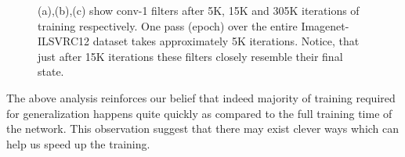 \begin{figure}[t!]
\caption{(a),(b),(c) show conv-1 filters after 5K, 15K and 305K iterations of training respectively. One pass (epoch) over the entire Imagenet-ILSVRC12 dataset takes approximately 5K iterations. Notice, that just after 15K iterations these filters closely resemble their final state.}

\label{fig:conv1}
\end{figure}


\setlength{\tabcolsep}{1pt}
\begin{table}[t!]
\begin{center}
\caption{Performance of 50-50 network for detection on pascal-voc-2007 challenge. (l5 is conv-5 and l7 is fc-7)}
\label{table:det-trajectory}
\end{center}
\end{table}
\setlength{\tabcolsep}{1.4pt}
The above analysis reinforces our belief that indeed majority of training required for generalization happens quite quickly as compared to the full training time of the network. This observation suggest that there may exist clever ways which can help us speed up the training.

